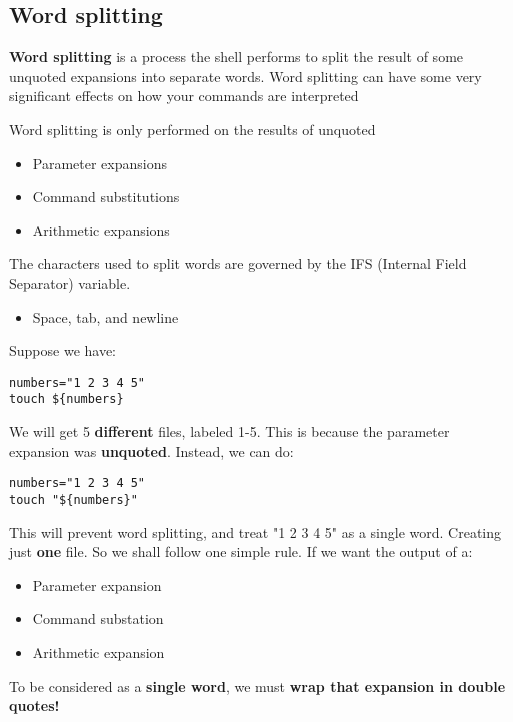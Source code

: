 \documentclass{report}
\begin{document}
  \pagebreak \bigbreak \noindent 
  \subsection{Word splitting}
  \bigbreak \noindent 
  \begin{concept}
     \textbf{Word splitting}  is a process the shell performs to split the result of some unquoted expansions into separate words. Word splitting can have some very significant effects on how your commands are interpreted
  \end{concept}
  \bigbreak \noindent 
  Word splitting is only performed on the results of unquoted 
  \begin{itemize}
      \item Parameter expansions
        \item Command substitutions
        \item Arithmetic expansions
  \end{itemize}
  \bigbreak \noindent 
  The characters used to split words are governed by the IFS (Internal Field Separator) variable.
  \begin{itemize}
      \item Space, tab, and newline
  \end{itemize}
  \bigbreak \noindent 
  Suppose we have:
  
  \begin{verbatim}
numbers="1 2 3 4 5"
touch ${numbers}
  \end{verbatim}
  \bigbreak \noindent
  
  \bigbreak \noindent 
  We will get 5 \textbf{different} files, labeled 1-5. This is because the parameter expansion was \textbf{unquoted}. Instead, we can do:
  
  \begin{verbatim}
numbers="1 2 3 4 5"
touch "${numbers}"
  \end{verbatim}
  \bigbreak \noindent
  
  \bigbreak \noindent 
  This will prevent word splitting, and treat "1 2 3 4 5" as a single word. Creating just \textbf{one} file.
  \bigbreak \noindent 
  So we shall follow one simple rule. If we want the output of a:
  \begin{itemize}
      \item Parameter expansion 
        \item Command substation
        \item Arithmetic expansion
  \end{itemize}
  \bigbreak \noindent 
  To be considered as a \textbf{single word}, we must \textbf{wrap that expansion in double quotes!}
\end{document}
